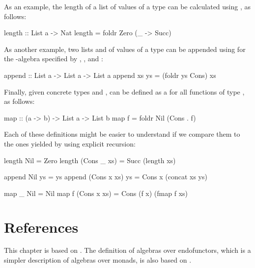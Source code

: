 \begin{example}
  As an example, the length of a list of values of a type
   can be calculated using , as
  follows:
  \begin{codehaskell}
length :: List a -> Nat
length = foldr Zero (\_ -> Succ)
  \end{codehaskell}
  As another example, two lists  and 
  of values of a type  can be appended using
   for the -algebra specified by
  , , and :
  \begin{codehaskell}
append :: List a -> List a -> List a
append xs ys = (foldr ys Cons) xs
  \end{codehaskell}
  Finally, given concrete types  and ,
   can be defined as a  for all
  functions  of type , as follows:
  \begin{codehaskell}
map :: (a -> b) -> List a -> List b
map f = foldr Nil (Cons . f)
  \end{codehaskell}
  Each of these definitions might be easier to understand if we
  compare them to the ones yielded by using explicit recursion:
  \begin{codehaskell}
length Nil         = Zero
length (Cons _ xs) = Succ (length xs)

append Nil         ys = ys
append (Cons x xs) ys = Cons x (concat xs ys)

map _ Nil         = Nil
map f (Cons x xs) = Cons (f x) (fmap f xs)
  \end{codehaskell}

\end{example}

\section{References}
\label{sec:algebras-references}

This chapter is based on \parencites[§
  10.5]{awodey-2010}[§~2.6]{bird-demoor-1997}[§ 2.1]{vene-2000}. The
definition of algebras over endofunctors, which is a simpler
description of algebras over monads, is also based on
\parencites[140]{maclane-1998}[595--596]{poigne-1992}.

\clearemptydoublepage
